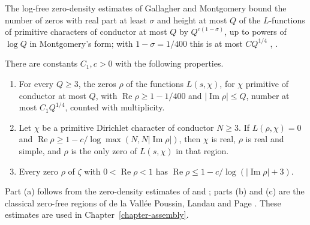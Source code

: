 The log-free zero-density estimates of Gallagher and Montgomery bound the number of zeros with
real part at least $\sigma$ and height at most $Q$ of the $L$-functions of primitive characters of
conductor at most $Q$ by $Q^{c(1-\sigma)}$, up to powers of $\log Q$ in Montgomery's form; with
$1-\sigma=1/400$ this is at most $CQ^{1/4}$ \cite{Gal70}, \cite[Chapter 12]{Mon71}.

\begin{theorem}\label{hf-zero-density-regions}
There are constants $C_1,c>0$ with the following properties.
\begin{enumerate}
\item For every $Q\geq3$, the zeros $\rho$ of the functions $L(s,\chi)$, for $\chi$ primitive of
  conductor at most $Q$, with $\operatorname{Re}\rho\geq1-1/400$ and
  $|\operatorname{Im}\rho|\leq Q$, number at most $C_1Q^{1/4}$, counted with multiplicity.
\item Let $\chi$ be a primitive Dirichlet character of conductor $N\geq3$. If $L(\rho,\chi)=0$ and
  $\operatorname{Re}\rho\geq1-c/\log\max(N,N|\operatorname{Im}\rho|)$, then $\chi$ is real, $\rho$
  is real and simple, and $\rho$ is the only zero of $L(s,\chi)$ in that region.
\item Every zero $\rho$ of $\zeta$ with $0<\operatorname{Re}\rho<1$ has
  $\operatorname{Re}\rho\leq1-c/\log(|\operatorname{Im}\rho|+3)$.
\end{enumerate}
\end{theorem}

Part (a) follows from the zero-density estimates of \cite{Gal70} and \cite[Chapter 12]{Mon71}; parts
(b) and (c) are the classical zero-free regions of de la Vallée Poussin, Landau and Page
\cite[Chapters 13 and 14]{Dav00}. These estimates are used in Chapter~\ref{chapter-assembly}.

